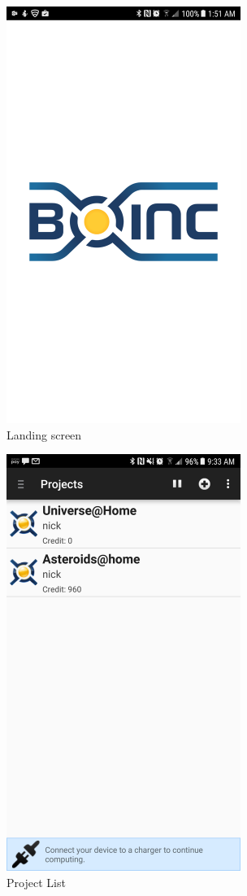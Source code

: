 \documentclass{article}
\begin{document}
\begin{figure}[ht]
      \includegraphics[width=3in]{img/t1s1.png}
      \centering
      \caption{Landing screen}
\end{figure}
\begin{figure}[ht]
      \includegraphics[width=3in]{img/t1s2.png}
      \centering
      \caption{Project List}
\end{figure}
\end{document}
